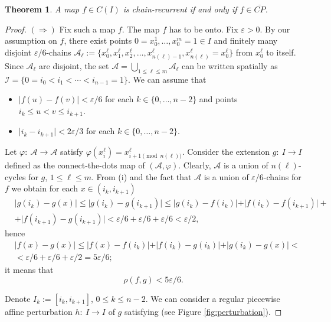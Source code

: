 \documentclass[12pt, a4paper]{amsart}
\newtheorem{theorem}{Theorem}[section]
\def\eps{\varepsilon}
\def\le{\leqslant}
\newcommand{\?}{{\bf ???}}
\begin{document}
\begin{theorem}\label{ChainRecurrentThenCPClosure}
A map $f \in C(I)$ is chain-recurrent if and only if $f\in \overline{CP}$.
\end{theorem}


\begin{proof}
$(\Rightarrow)$ Fix such a map $f$. The map $f$ has to be onto. Fix $\eps>0$. 
 By our assumption on $f$, there exist points $0=x^1_0,\dots,x^m_0=1\in I$ and  finitely many disjoint $\eps/6$-chains $\mathcal A_{\ell}:=\{x^{\ell}_0,x^{\ell}_1,x^{\ell}_2,\ldots,x^{\ell}_{n(\ell)-1},x^{\ell}_{n(\ell)}=x^{\ell}_0\}$ from $x^{\ell}_0$ to itself.  Since $\mathcal A_{\ell}$ are disjoint, the set $\mathcal A=\bigcup_{1\le \ell\le m}\mathcal A_{\ell}$ can be written spatially as $\mathcal I=\{0=i_0<i_1<\cdots<i_{n-1}=1\}$.
We can assume that 
\begin{itemize}
\item[(i)] $\vert f(u)-f(v)\vert<\eps/6$ for each $k\in \{0,\dots,n-2\}$ and points $i_k\le u<v\le i_{k+1}$.
 \item[(ii)] $\vert i_k-i_{k+1}\vert<2\eps/3$ for each $k\in \{0,\dots,n-2\}$.
\end{itemize}
 Let $\varphi\colon~\mathcal A\to \mathcal A$ satisfy $\varphi(x^{\ell}_i)=x^{\ell}_{i+1 \pmod{n(\ell)}}$. Consider the extension $g\colon~I\to I$ defined as the connect-the-dots map of $(\mathcal A,\varphi)$. Clearly, $\mathcal A$ is a union of $n(\ell)$-cycles for $g$, $1\le \ell\le m$. From (i) and the fact that $\mathcal A$ is a union of $\eps/6$-chains for $f$ we obtain for each $x \in (i_k,i_{k+1})$
\begin{align}&\label{a:1}\vert g(i_k)-g(x)\vert\le\vert g(i_k)-g(i_{k+1})\vert\le \vert g(i_k)-f(i_k)\vert+\vert f(i_k)-f(i_{k+1})\vert+ \\
&+\vert
f(i_{k+1})-g(i_{k+1})\vert<\eps/6+\eps/6+\eps/6<\eps/2\nonumber,
\end{align}
hence
\begin{align*}&\vert f(x)-g(x)\vert\le \vert f(x)-f(i_k)\vert+\vert f(i_k)-g(i_k)\vert+ \vert
g(i_k)-g(x)\vert<\\&<\eps/6+\eps/6+\eps/2=5\eps/6;
\end{align*}
it means that 
\begin{equation}\label{e:dist}\rho(f,g) <5\eps/6.
    \end{equation}

Denote $I_k :=[i_k,i_{k+1}]$, $0\le k\le n-2$. We can consider a regular piecewise affine perturbation $h\colon~I\to I$ of $g$ satisfying (see Figure \ref{fig:perturbation}).


\end{proof}
\end{document}
